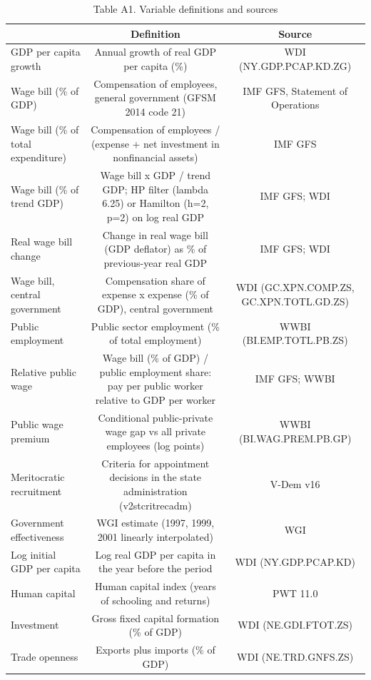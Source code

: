 \begin{table}[htbp]\centering\footnotesize
\providecommand{\sym}[1]{\ensuremath{^{#1}}}
\caption{Table A1. Variable definitions and sources}\label{tab:TableA1_definitions}
\begin{tabular}{l*{2}{c}}
\toprule
 & Definition & Source \\
\midrule
GDP per capita growth & Annual growth of real GDP per capita (\%) & WDI (NY.GDP.PCAP.KD.ZG) \\
Wage bill (\% of GDP) & Compensation of employees, general government (GFSM 2014 code 21) & IMF GFS, Statement of Operations \\
Wage bill (\% of total expenditure) & Compensation of employees / (expense + net investment in nonfinancial assets) & IMF GFS \\
Wage bill (\% of trend GDP) & Wage bill x GDP / trend GDP; HP filter (lambda 6.25) or Hamilton (h=2, p=2) on log real GDP & IMF GFS; WDI \\
Real wage bill change & Change in real wage bill (GDP deflator) as \% of previous-year real GDP & IMF GFS; WDI \\
Wage bill, central government & Compensation share of expense x expense (\% of GDP), central government & WDI (GC.XPN.COMP.ZS, GC.XPN.TOTL.GD.ZS) \\
Public employment & Public sector employment (\% of total employment) & WWBI (BI.EMP.TOTL.PB.ZS) \\
Relative public wage & Wage bill (\% of GDP) / public employment share: pay per public worker relative to GDP per worker & IMF GFS; WWBI \\
Public wage premium & Conditional public-private wage gap vs all private employees (log points) & WWBI (BI.WAG.PREM.PB.GP) \\
Meritocratic recruitment & Criteria for appointment decisions in the state administration (v2stcritrecadm) & V-Dem v16 \\
Government effectiveness & WGI estimate (1997, 1999, 2001 linearly interpolated) & WGI \\
Log initial GDP per capita & Log real GDP per capita in the year before the period & WDI (NY.GDP.PCAP.KD) \\
Human capital & Human capital index (years of schooling and returns) & PWT 11.0 \\
Investment & Gross fixed capital formation (\% of GDP) & WDI (NE.GDI.FTOT.ZS) \\
Trade openness & Exports plus imports (\% of GDP) & WDI (NE.TRD.GNFS.ZS) \\

\end{tabular}
\end{table}
